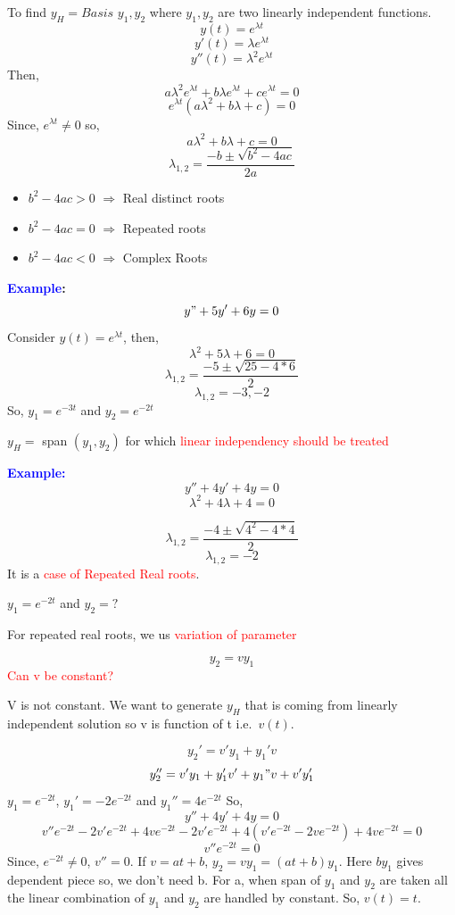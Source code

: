 \documentclass[
  11pt,
]{article}
\providecommand{\tightlist}{%
  \setlength{\itemsep}{0pt}\setlength{\parskip}{0pt}}
\begin{document}
To find \(y_H = Basis\) \({y_1, y_2}\) where \(y_1, y_2\) are two
linearly independent functions. \[y(t)=e^{\lambda t}\]
\[y'(t)=\lambda e^{\lambda t}\] \[y''(t)=\lambda^2 e^{\lambda t}\] Then,
\[a\lambda^2 e^{\lambda t} + b\lambda e^{\lambda t} + c e^{\lambda t} = 0\]
\[e^{\lambda t}(a\lambda^2 +b\lambda + c) = 0\] Since,
\(e^{\lambda t} \neq 0\) so, \[a\lambda^2 +b\lambda + c= 0\]
\[\lambda_{1,2} = \frac{-b\pm\sqrt{b^2-4ac}}{2a}\]

\begin{itemize}
\tightlist
\item
  \(b^2-4ac>0\) \(\Longrightarrow\) Real distinct roots
\item
  \(b^2-4ac=0\) \(\Longrightarrow\) Repeated roots
\item
  \(b^2-4ac<0\) \(\Longrightarrow\) Complex Roots
\end{itemize}

\textbf{\textcolor{blue}{Example}:} \[y"+5y'+6y=0\] Consider
\(y(t)=e^{\lambda t}\), then, \[\lambda^2+5\lambda+6=0\]
\[\lambda_{1,2}=\frac{-5 \pm \sqrt{25-4*6}}{2}\] \[\lambda_{1,2}=-3,-2\]
So, \(y_1 = e^{-3t}\) and \(y_2 = e^{-2t}\)

\(y_H =\) span \((y_1, y_2)\) for which
\textcolor{red}{linear independency should be treated}

\textbf{\textcolor{blue}{Example:}} \[y''+4y'+4y=0\]
\[\lambda^2+4\lambda+4=0\]

\[\lambda_{1,2}=\frac{-4 \pm \sqrt{4^2-4*4}}{2}\] \[\lambda_{1,2} = -2\]
It is a \textcolor{red}{case of Repeated Real roots}.

\(y_1=e^{-2t}\) and \(y_2=?\)

For repeated real roots, we us \textcolor{red}{variation of parameter}

\[y_2=vy_1 \tag{1}\] \textcolor{red}{Can v be constant?}

V is not constant. We want to generate \(y_H\) that is coming from
linearly independent solution so v is function of t i.e.~\(v(t)\).

\[y_2'=v'y_1+y_1'v\] \[y_2''=v'y_1+y_1'v'+y_1"v+v'y_1'\]
\(y_1=e^{-2t}\), \(y_1'=-2e^{-2t}\) and \(y_1''=4e^{-2t}\) So,
\[y''+4y'+4y=0\]
\[v''e^{-2t}-2v'e^{-2t}+4ve^{-2t}-2v'e^{-2t}+4(v'e^{-2t}-2ve^{-2t})+4ve^{-2t}=0\]
\[v''e^{-2t}=0\] Since, \(e^{-2t} \neq 0\), \(v''=0\). If \(v = at+b\),
\(y_2=vy_1 =(at+b)y_1\). Here \(by_1\) gives dependent piece so, we
don't need b. For a, when span of \(y_1\) and \(y_2\) are taken all the
linear combination of \(y_1\) and \(y_2\) are handled by constant. So,
\(v(t) = t\).
\end{document}
